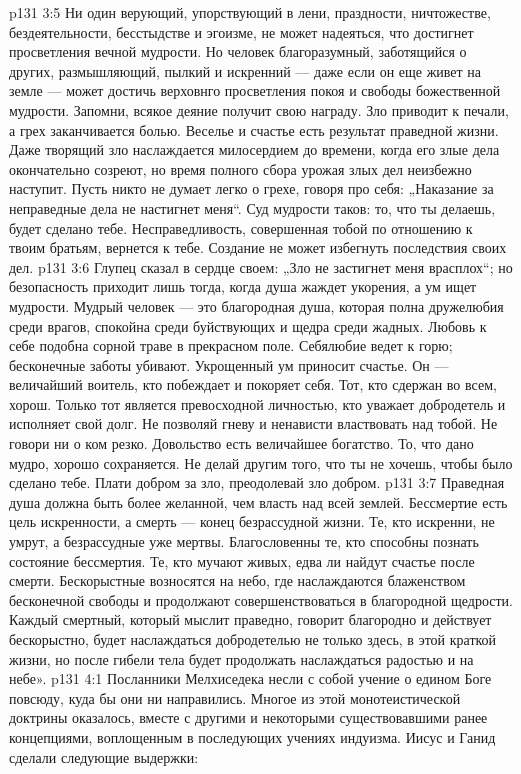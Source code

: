 \vs p131 3:5 Ни один верующий, упорствующий в лени, праздности, ничтожестве, бездеятельности, бесстыдстве и эгоизме, не может надеяться, что достигнет просветления вечной мудрости. Но человек благоразумный, заботящийся о других, размышляющий, пылкий и искренний --- даже если он еще живет на земле --- может достичь верховнго просветления покоя и свободы божественной мудрости. Запомни, всякое деяние получит свою награду. Зло приводит к печали, а грех заканчивается болью. Веселье и счастье есть результат праведной жизни. Даже творящий зло наслаждается милосердием до времени, когда его злые дела окончательно созреют, но время полного сбора урожая злых дел неизбежно наступит. Пусть никто не думает легко о грехе, говоря про себя: „Наказание за неправедные дела не настигнет меня“. Суд мудрости таков: то, что ты делаешь, будет сделано тебе. Несправедливость, совершенная тобой по отношению к твоим братьям, вернется к тебе. Создание не может избегнуть последствия своих дел.
\vs p131 3:6 Глупец сказал в сердце своем: „Зло не застигнет меня врасплох“; но безопасность приходит лишь тогда, когда душа жаждет укорения, а ум ищет мудрости. Мудрый человек --- это благородная душа, которая полна дружелюбия среди врагов, спокойна среди буйствующих и щедра среди жадных. Любовь к себе подобна сорной траве в прекрасном поле. Себялюбие ведет к горю; бесконечные заботы убивают. Укрощенный ум приносит счастье. Он --- величайший воитель, кто побеждает и покоряет себя. Тот, кто сдержан во всем, хорош. Только тот является превосходной личностью, кто уважает добродетель и исполняет свой долг. Не позволяй гневу и ненависти властвовать над тобой. Не говори ни о ком резко. Довольство есть величайшее богатство. То, что дано мудро, хорошо сохраняется. Не делай другим того, что ты не хочешь, чтобы было сделано тебе. Плати добром за зло, преодолевай зло добром.
\vs p131 3:7 Праведная душа должна быть более желанной, чем власть над всей землей. Бессмертие есть цель искренности, а смерть --- конец безрассудной жизни. Те, кто искренни, не умрут, а безрассудные уже мертвы. Благословенны те, кто способны познать состояние бессмертия. Те, кто мучают живых, едва ли найдут счастье после смерти. Бескорыстные возносятся на небо, где наслаждаются блаженством бесконечной свободы и продолжают совершенствоваться в благородной щедрости. Каждый смертный, который мыслит праведно, говорит благородно и действует бескорыстно, будет наслаждаться добродетелью не только здесь, в этой краткой жизни, но после гибели тела будет продолжать наслаждаться радостью и на небе».
\vs p131 4:1 Посланники Мелхиседека несли с собой учение о едином Боге повсюду, куда бы они ни направились. Многое из этой монотеистической доктрины оказалось, вместе с другими и некоторыми существовавшими ранее концепциями, воплощенным в последующих учениях индуизма. Иисус и Ганид сделали следующие выдержки:
